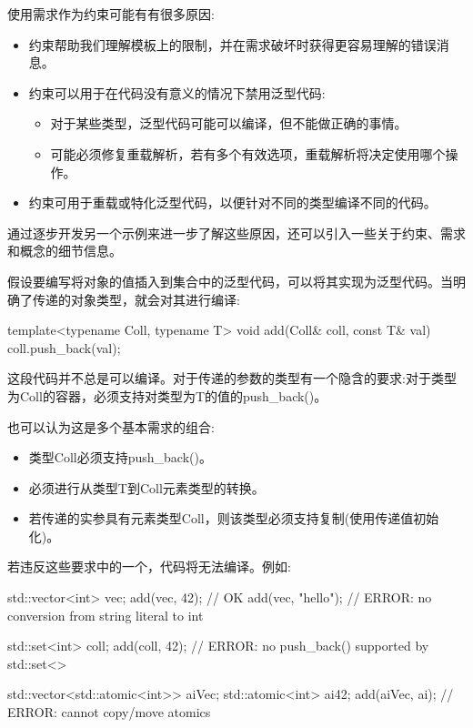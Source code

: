 

使用需求作为约束可能有有很多原因:

\begin{itemize}
\item
约束帮助我们理解模板上的限制，并在需求破坏时获得更容易理解的错误消息。

\item
约束可以用于在代码没有意义的情况下禁用泛型代码:
\begin{itemize}
\item
对于某些类型，泛型代码可能可以编译，但不能做正确的事情。

\item
可能必须修复重载解析，若有多个有效选项，重载解析将决定使用哪个操作。
\end{itemize}

\item
约束可用于重载或特化泛型代码，以便针对不同的类型编译不同的代码。
\end{itemize}

通过逐步开发另一个示例来进一步了解这些原因，还可以引入一些关于约束、需求和概念的细节信息。


假设要编写将对象的值插入到集合中的泛型代码，可以将其实现为泛型代码。当明确了传递的对象类型，就会对其进行编译:

\begin{cpp}
template<typename Coll, typename T>
void add(Coll& coll, const T& val)
{
	coll.push_back(val);
}
\end{cpp}

这段代码并不总是可以编译。对于传递的参数的类型有一个隐含的要求:对于类型为Coll的容器，必须支持对类型为T的值的push\_back()。

也可以认为这是多个基本需求的组合:

\begin{itemize}
\item
类型Coll必须支持push\_back()。

\item
必须进行从类型T到Coll元素类型的转换。

\item
若传递的实参具有元素类型Coll，则该类型必须支持复制(使用传递值初始化)。
\end{itemize}

若违反这些要求中的一个，代码将无法编译。例如:

\begin{cpp}
std::vector<int> vec;
add(vec, 42); // OK
add(vec, "hello"); // ERROR: no conversion from string literal to int

std::set<int> coll;
add(coll, 42); // ERROR: no push_back() supported by std::set<>

std::vector<std::atomic<int>> aiVec;
std::atomic<int> ai{42};
add(aiVec, ai); // ERROR: cannot copy/move atomics
\end{cpp}

